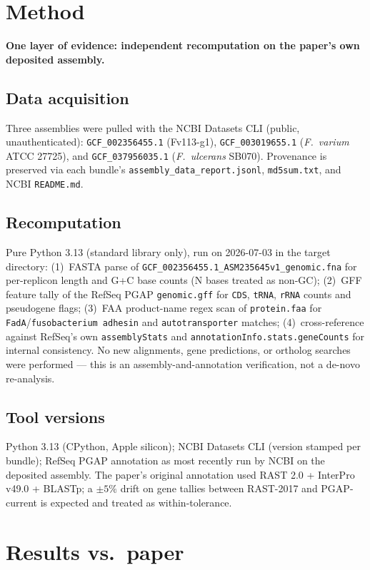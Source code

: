 \documentclass[11pt]{article}
\begin{document}
\section{Method}

\textbf{One layer of evidence: independent recomputation on the paper's own deposited assembly.}

\subsection{Data acquisition}
Three assemblies were pulled with the NCBI Datasets CLI (public, unauthenticated):
\texttt{GCF\_002356455.1} (Fv113-g1), \texttt{GCF\_003019655.1} (\emph{F.~varium} ATCC 27725),
and \texttt{GCF\_037956035.1} (\emph{F.~ulcerans} SB070). Provenance is preserved via each
bundle's \texttt{assembly\_data\_report.jsonl}, \texttt{md5sum.txt}, and NCBI \texttt{README.md}.

\subsection{Recomputation}
Pure Python 3.13 (standard library only), run on 2026-07-03 in the target directory:
(1)~FASTA parse of \texttt{GCF\_002356455.1\_ASM235645v1\_genomic.fna} for per-replicon
length and G+C base counts (N bases treated as non-GC); (2)~GFF feature tally of the RefSeq
PGAP \texttt{genomic.gff} for \texttt{CDS}, \texttt{tRNA}, \texttt{rRNA} counts and pseudogene
flags; (3)~FAA product-name regex scan of \texttt{protein.faa} for
\texttt{FadA}/\texttt{fusobacterium adhesin} and \texttt{autotransporter} matches;
(4)~cross-reference against RefSeq's own \texttt{assemblyStats} and
\texttt{annotationInfo.stats.geneCounts} for internal consistency. No new alignments,
gene predictions, or ortholog searches were performed --- this is an assembly-and-annotation
verification, not a de-novo re-analysis.

\subsection{Tool versions}
Python 3.13 (CPython, Apple silicon); NCBI Datasets CLI (version stamped per bundle);
RefSeq PGAP annotation as most recently run by NCBI on the deposited assembly. The paper's
original annotation used RAST 2.0 + InterPro v49.0 + BLASTp; a $\pm 5\%$ drift on gene
tallies between RAST-2017 and PGAP-current is expected and treated as within-tolerance.

\section{Results vs.\ paper}
\end{document}
